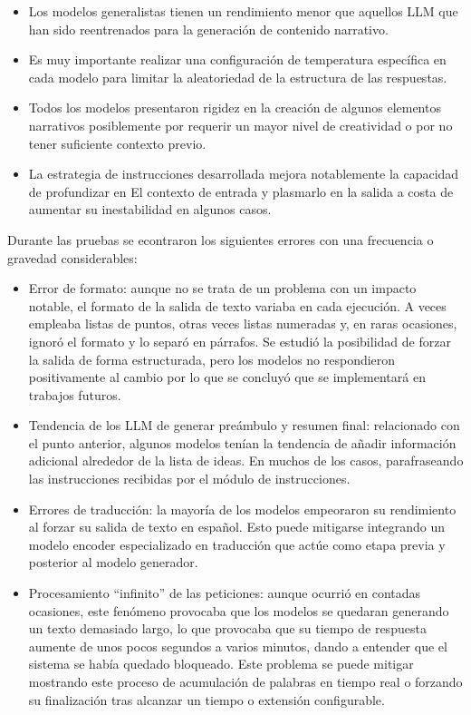 \begin{itemize}
\item Los modelos generalistas tienen un rendimiento menor que aquellos LLM
	  que han sido reentrenados para la generación de contenido narrativo.
\item Es muy importante realizar una configuración de temperatura específica
      en cada modelo para limitar la aleatoriedad de la estructura de las respuestas.
\item Todos los modelos presentaron rigidez en la creación de algunos elementos narrativos
      posiblemente por requerir un mayor nivel de creatividad o por no tener suficiente contexto previo.
\item La estrategia de instrucciones desarrollada mejora notablemente la capacidad de profundizar en El
      contexto de entrada y plasmarlo en la salida a costa de aumentar su inestabilidad en algunos casos.
\end{itemize}

Durante las pruebas se econtraron los siguientes errores con una frecuencia o gravedad considerables:
\begin{itemize}
\item Error de formato:
	  aunque no se trata de un problema con un impacto notable,
	  el formato de la salida de texto variaba en cada ejecución.
	  A veces empleaba listas de puntos, otras veces listas numeradas y, en raras ocasiones,
	  ignoró el formato y lo separó en párrafos.
	  Se estudió la posibilidad de forzar la salida de forma estructurada, pero los modelos no
	  respondieron positivamente al cambio por lo que se concluyó que se implementará en trabajos futuros.
\item Tendencia de los LLM de generar preámbulo y resumen final:
      relacionado con el punto anterior,
	  algunos modelos tenían la tendencia de añadir información adicional alrededor de la lista de ideas.
	  En muchos de los casos, parafraseando las instrucciones recibidas por el módulo de instrucciones.
\item Errores de traducción: la mayoría de los modelos empeoraron su rendimiento al forzar su salida de 
      texto en español. Esto puede mitigarse integrando un modelo encoder especializado en traducción
	  que actúe como etapa previa y posterior al modelo generador.
\item Procesamiento ``infinito'' de las peticiones:
      aunque ocurrió en contadas ocasiones, este fenómeno provocaba que los modelos se quedaran
	  generando un texto demasiado largo, lo que provocaba que su tiempo de respuesta aumente
	  de unos pocos segundos a varios minutos, dando a entender que el sistema se había quedado bloqueado.
	  Este problema se puede mitigar mostrando este proceso de acumulación de palabras en tiempo real
	  o forzando su finalización tras alcanzar un tiempo o extensión configurable.
\end{itemize}